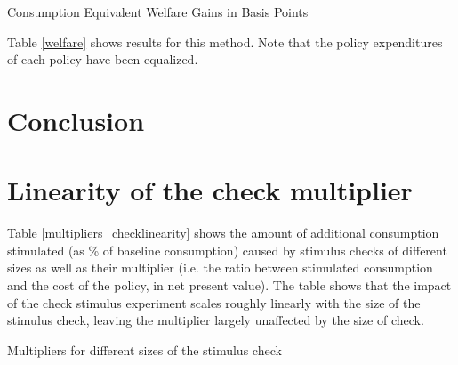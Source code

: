 \documentclass[11pt]{article}
\begin{document}
	\begin{table} 
		\center
		
		\caption{Consumption Equivalent Welfare Gains in Basis Points }
		\label{welfare}
	\end{table}
	
	Table \ref{welfare} shows results for this method. Note that the policy expenditures of each policy have been equalized.
	
	\section{Conclusion}
	
	\let\bibfont=\small
	
	
	
	\appendix
	\section{Linearity of the check multiplier}
	
	Table \ref{multipliers_checklinearity} shows the amount of additional consumption stimulated (as \% of baseline consumption) caused by stimulus checks of different sizes as well as their multiplier (i.e. the ratio between stimulated consumption and the cost of the policy, in net present value). The table shows that the impact of the check stimulus experiment scales roughly linearly with the size of the stimulus check, leaving the multiplier largely unaffected by the size of check.
	
	\begin{table} 
		\center
		
		\caption{Multipliers for different sizes of the stimulus check}
		\label{multipliers_checklinearity}
	\end{table}
	
	
\end{document}
